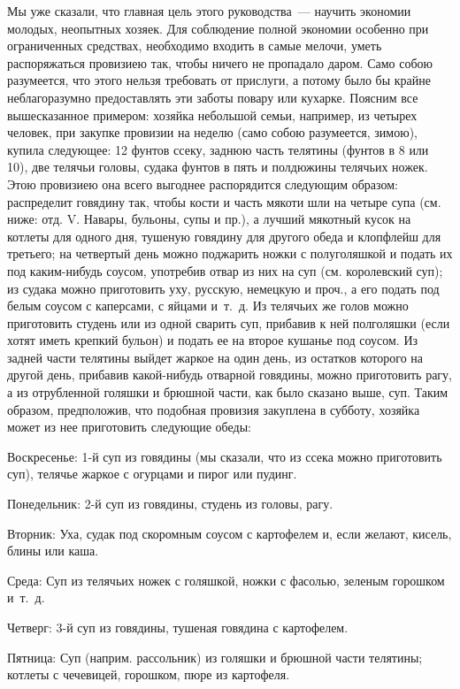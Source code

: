 Мы уже сказали, что главная цель этого руководства~--- научить экономии молодых, неопытных хозяек. Для соблюдение полной экономии особенно при ограниченных средствах, необходимо входить в самые мелочи, уметь распоряжаться провизиею так, чтобы ничего не пропадало даром. Само собою разумеется, что этого нельзя требовать от прислуги, а потому было бы крайне неблагоразумно предоставлять эти заботы повару или кухарке. Поясним все вышесказанное примером: хозяйка небольшой семьи, например, из четырех человек, при закупке провизии на неделю (само собою разумеется, зимою), купила следующее: 12 фунтов ссеку, заднюю часть телятины (фунтов в 8 или 10), две телячьи головы, судака фунтов в пять и полдюжины телячьих ножек. Этою провизиею она всего выгоднее распорядится следующим образом: распределит говядину так, чтобы кости и часть мякоти шли на четыре супа (см. ниже: отд. V. Навары, бульоны, супы и пр.), а лучший мякотный кусок на котлеты для одного дня, тушеную говядину для другого обеда и клопфлейш для третьего; на четвертый день можно поджарить ножки с полуголяшкой и подать их под каким-нибудь соусом, употребив отвар из них на суп (см. королевский суп); из судака можно приготовить уху, русскую, немецкую и проч., а его подать под белым соусом с каперсами, с яйцами и~т.~д. Из телячьих же голов можно приготовить студень или из одной сварить суп, прибавив к ней полголяшки (если хотят иметь крепкий бульон) и подать ее на второе кушанье под соусом. Из задней части телятины выйдет жаркое на один день, из остатков которого на другой день, прибавив какой-нибудь отварной говядины, можно приготовить рагу, а из отрубленной голяшки и брюшной части, как было сказано выше, суп. Таким образом, предположив, что подобная провизия закуплена в субботу, хозяйка может из нее приготовить следующие обеды:

Воскресенье: 1-й суп из говядины (мы сказали, что из ссека можно приготовить суп), телячье жаркое с огурцами и пирог или пудинг.

Понедельник: 2-й суп из говядины, студень из головы, рагу.

Вторник: Уха, судак под скоромным соусом с картофелем и, если желают, кисель, блины или каша.

Среда: Суп из телячьих ножек с голяшкой, ножки с фасолью, зеленым горошком и~т.~д.

Четверг: 3-й суп из говядины, тушеная говядина с картофелем.

Пятница: Суп (наприм. рассольник) из голяшки и брюшной части телятины; котлеты с чечевицей, горошком, пюре из картофеля.

